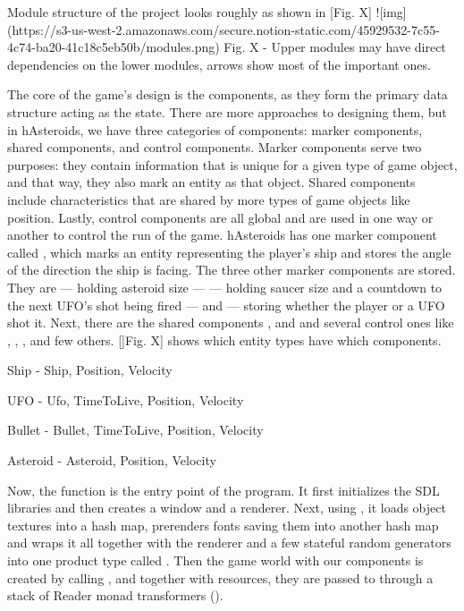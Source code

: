 \documentclass[
  digital, %
  color,   %
  table,   %
  oneside, %
  lof,     %
  lot,     %
]{fithesis3}
\begin{document}
Module structure of the project looks roughly as shown in [Fig. X]
![img](https://s3-us-west-2.amazonaws.com/secure.notion-static.com/45929532-7c55-4c74-ba20-41c18c5eb50b/modules.png)
Fig. X - Upper modules may have direct dependencies on the lower modules, arrows show most of the important ones.

The core of the game's design is the components,
as they form the primary data structure acting as the state.
There are more approaches to designing them, but in hAsteroids,
we have three categories of components: marker components,
shared components, and control components. Marker components serve two purposes:
they contain information that is unique for a given type of game object,
and that way, they also mark an entity as that object.
Shared components include characteristics that are shared by more types
of game objects like position. Lastly, control components are all global
and are used in one way or another to control the run of the game.
hAsteroids has one  marker component called ,
which marks an entity representing the player's ship and stores
the angle of the direction the ship is facing. The three other marker
components are  stored. They are  — holding
asteroid size —  — holding saucer size and a countdown
to the next UFO's shot being fired — and  — storing whether
the player or a UFO shot it. Next, there are the shared components
,  and 
and several  control ones like ,
, ,  and few others.
[]Fig. X] shows which entity types have which components.

Ship - Ship, Position, Velocity

UFO - Ufo, TimeToLive, Position, Velocity

Bullet - Bullet, TimeToLive, Position, Velocity

Asteroid - Asteroid, Position, Velocity

Now, the  function is the entry point of the program. It first initializes
the SDL libraries and then creates a window and a renderer. Next, using ,
it loads object textures into a hash map, prerenders fonts saving them into another
hash map and wraps it all together with the renderer and a few stateful random generators
into one product type called . Then the game world with our
components is created by calling , and together with resources,
they are passed to  through a stack
of Reader monad transformers ().
\end{document}
